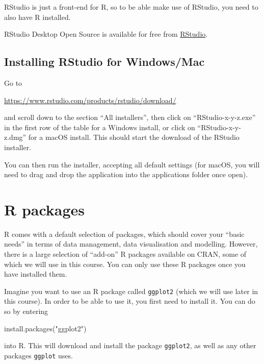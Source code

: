 \documentclass[
]{book}
\newenvironment{Shaded}{\begin{snugshade}}{\end{snugshade}}
\newcommand{\FunctionTok}[1]{\textcolor[rgb]{0.00,0.00,0.00}{#1}}
\newcommand{\NormalTok}[1]{#1}
\newcommand{\StringTok}[1]{\textcolor[rgb]{0.31,0.60,0.02}{#1}}
\begin{document}
RStudio is just a front-end for R, so to be able make use of RStudio, you need to also have R installed.

RStudio Desktop Open Source is available for free from \href{https://rstudio.com}{RStudio}.

\hypertarget{installing-rstudio-for-windowsmac}{%
\subsection{Installing RStudio for Windows/Mac}\label{installing-rstudio-for-windowsmac}}

Go to

\url{https://www.rstudio.com/products/rstudio/download/}

and scroll down to the section ``All installers'', then click on ``RStudio-x-y-z.exe'' in the first row of the table for a Windows install, or click on ``RStudio-x-y-z.dmg'' for a macOS install. This should start the download of the RStudio installer.

You can then run the installer, accepting all default settings (for macOS, you will need to drag and drop the application into the applications folder once open).

\hypertarget{r-packages}{%
\section{R packages}\label{r-packages}}

R comes with a default selection of packages, which should cover your ``basic needs'' in terms of data management, data visualisation and modelling. However, there is a large selection of ``add-on'' R packages available on CRAN, some of which we will use in this course. You can only use these R packages once you have installed them.

Imagine you want to use an R package called \texttt{ggplot2} (which we will use later in this course). In order to be able to use it, you first need to install it. You can do so by entering

\begin{Shaded}
\begin{Highlighting}[]
\FunctionTok{install.packages}\NormalTok{(}\StringTok{"ggplot2"}\NormalTok{)}
\end{Highlighting}
\end{Shaded}

into R. This will download and install the package \texttt{ggplot2}, as well as any other packages \texttt{ggplot} uses.
\end{document}
